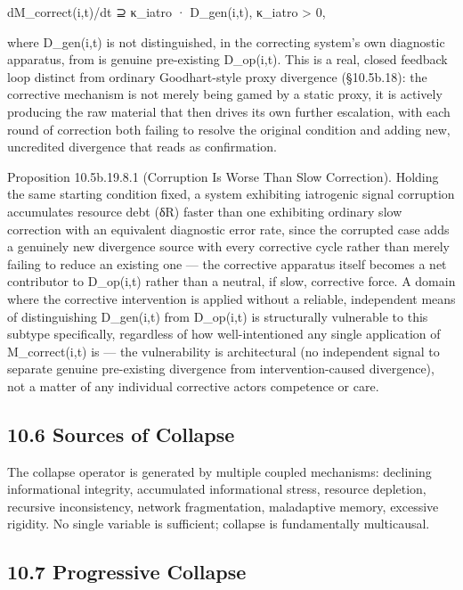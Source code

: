 \documentclass[
]{article}
\begin{document}
dM\_correct(i,t)/dt ⊇ κ\_iatro · D\_gen(i,t), κ\_iatro \textgreater{} 0,

where D\_gen(i,t) is not distinguished, in the correcting system's own
diagnostic apparatus, from is genuine pre-existing D\_op(i,t). This is a
real, closed feedback loop distinct from ordinary Goodhart-style proxy
divergence (§10.5b.18): the corrective mechanism is not merely being
gamed by a static proxy, it is actively producing the raw material that
then drives its own further escalation, with each round of correction
both failing to resolve the original condition and adding new,
uncredited divergence that reads as confirmation.

Proposition 10.5b.19.8.1 (Corruption Is Worse Than Slow Correction).
Holding the same starting condition fixed, a system exhibiting
iatrogenic signal corruption accumulates resource debt (δR) faster than
one exhibiting ordinary slow correction with an equivalent diagnostic
error rate, since the corrupted case adds a genuinely new divergence
source with every corrective cycle rather than merely failing to reduce
an existing one --- the corrective apparatus itself becomes a net
contributor to D\_op(i,t) rather than a neutral, if slow, corrective
force. A domain where the corrective intervention is applied without a
reliable, independent means of distinguishing D\_gen(i,t) from
D\_op(i,t) is structurally vulnerable to this subtype specifically,
regardless of how well-intentioned any single application of
M\_correct(i,t) is --- the vulnerability is architectural (no
independent signal to separate genuine pre-existing divergence from
intervention-caused divergence), not a matter of any individual
corrective actors competence or care.

\hypertarget{sources-of-collapse}{%
\subsection{10.6 Sources of Collapse}\label{sources-of-collapse}}

The collapse operator is generated by multiple coupled mechanisms:
declining informational integrity, accumulated informational stress,
resource depletion, recursive inconsistency, network fragmentation,
maladaptive memory, excessive rigidity. No single variable is
sufficient; collapse is fundamentally multicausal.

\hypertarget{progressive-collapse}{%
\subsection{10.7 Progressive Collapse}\label{progressive-collapse}}
\end{document}
